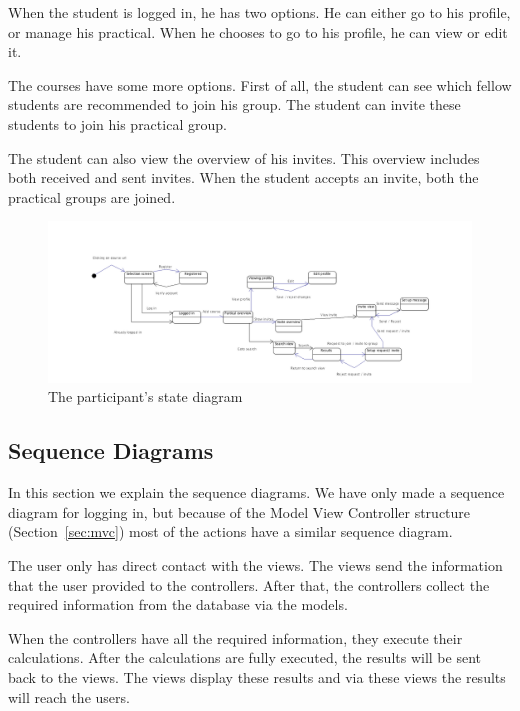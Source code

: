 When the student is logged in, he has two options.
He can either go to his profile, or manage his practical.
When he chooses to go to his profile, he can view or edit it.

The courses have some more options.
First of all, the student can see which fellow students are recommended to join his group.
The student can invite these students to join his practical group.

The student can also view the overview of his invites.
This overview includes both received and sent invites.
When the student accepts an invite, both the practical groups are joined.

\begin{figure}[H]
    \centering
    \captionsetup{justification=centering}
    \includegraphics[width=\textwidth, frame]{images/state_diagram_participant}
    \caption{The participant's state diagram}
    \label{state_diagram_participant}
\end{figure}

\subsection{Sequence Diagrams}
In this section we explain the sequence diagrams.
We have only made a sequence diagram for logging in, but because of the Model View Controller structure (Section~\ref{sec:mvc}) most of the actions have a similar sequence diagram.

The user only has direct contact with the views.
The views send the information that the user provided to the controllers.
After that, the controllers collect the required information from the database via the models.

When the controllers have all the required information, they execute their calculations.
After the calculations are fully executed, the results will be sent back to the views.
The views display these results and via these views the results will reach the users.

